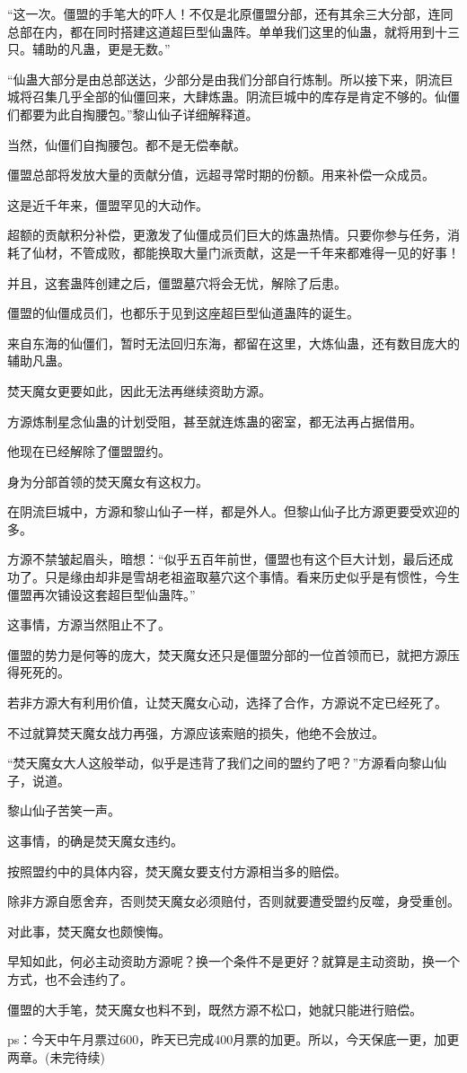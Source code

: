 \begin{this_body}
“这一次。僵盟的手笔大的吓人！不仅是北原僵盟分部，还有其余三大分部，连同总部在内，都在同时搭建这道超巨型仙蛊阵。单单我们这里的仙蛊，就将用到十三只。辅助的凡蛊，更是无数。”

“仙蛊大部分是由总部送达，少部分是由我们分部自行炼制。所以接下来，阴流巨城将召集几乎全部的仙僵回来，大肆炼蛊。阴流巨城中的库存是肯定不够的。仙僵们都要为此自掏腰包。”黎山仙子详细解释道。

当然，仙僵们自掏腰包。都不是无偿奉献。

僵盟总部将发放大量的贡献分值，远超寻常时期的份额。用来补偿一众成员。

这是近千年来，僵盟罕见的大动作。

超额的贡献积分补偿，更激发了仙僵成员们巨大的炼蛊热情。只要你参与任务，消耗了仙材，不管成败，都能换取大量门派贡献，这是一千年来都难得一见的好事！

并且，这套蛊阵创建之后，僵盟墓穴将会无忧，解除了后患。

僵盟的仙僵成员们，也都乐于见到这座超巨型仙道蛊阵的诞生。

来自东海的仙僵们，暂时无法回归东海，都留在这里，大炼仙蛊，还有数目庞大的辅助凡蛊。

焚天魔女更要如此，因此无法再继续资助方源。

方源炼制星念仙蛊的计划受阻，甚至就连炼蛊的密室，都无法再占据借用。

他现在已经解除了僵盟盟约。

身为分部首领的焚天魔女有这权力。

在阴流巨城中，方源和黎山仙子一样，都是外人。但黎山仙子比方源更要受欢迎的多。

方源不禁皱起眉头，暗想：“似乎五百年前世，僵盟也有这个巨大计划，最后还成功了。只是缘由却非是雪胡老祖盗取墓穴这个事情。看来历史似乎是有惯性，今生僵盟再次铺设这套超巨型仙蛊阵。”

这事情，方源当然阻止不了。

僵盟的势力是何等的庞大，焚天魔女还只是僵盟分部的一位首领而已，就把方源压得死死的。

若非方源大有利用价值，让焚天魔女心动，选择了合作，方源说不定已经死了。

不过就算焚天魔女战力再强，方源应该索赔的损失，他绝不会放过。

“焚天魔女大人这般举动，似乎是违背了我们之间的盟约了吧？”方源看向黎山仙子，说道。

黎山仙子苦笑一声。

这事情，的确是焚天魔女违约。

按照盟约中的具体内容，焚天魔女要支付方源相当多的赔偿。

除非方源自愿舍弃，否则焚天魔女必须赔付，否则就要遭受盟约反噬，身受重创。

对此事，焚天魔女也颇懊悔。

早知如此，何必主动资助方源呢？换一个条件不是更好？就算是主动资助，换一个方式，也不会违约了。

僵盟的大手笔，焚天魔女也料不到，既然方源不松口，她就只能进行赔偿。

ps：今天中午月票过600，昨天已完成400月票的加更。所以，今天保底一更，加更两章。(未完待续)

\end{this_body}


